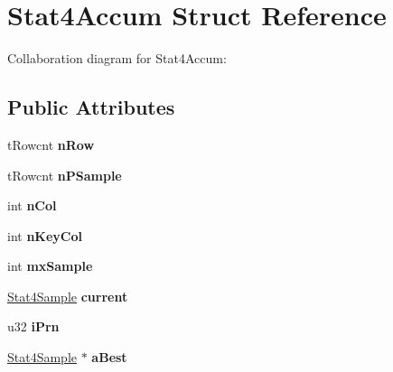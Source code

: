 \hypertarget{struct_stat4_accum}{\section{Stat4\+Accum Struct Reference}
\label{struct_stat4_accum}
}


Collaboration diagram for Stat4\+Accum\+:
\subsection*{Public Attributes}
\begin{DoxyCompactItemize}
\item 
\hypertarget{struct_stat4_accum_a7f06c1f2e4790e21b25aa68e5340f0b3}{t\+Rowcnt {\bfseries n\+Row}}\label{struct_stat4_accum_a7f06c1f2e4790e21b25aa68e5340f0b3}

\item 
\hypertarget{struct_stat4_accum_ac86c036108462008795ebfb7994ff674}{t\+Rowcnt {\bfseries n\+P\+Sample}}\label{struct_stat4_accum_ac86c036108462008795ebfb7994ff674}

\item 
\hypertarget{struct_stat4_accum_a4b5d9944be8bd28e2dcaaa10d23702db}{int {\bfseries n\+Col}}\label{struct_stat4_accum_a4b5d9944be8bd28e2dcaaa10d23702db}

\item 
\hypertarget{struct_stat4_accum_a018b3aa526f4d376e55042e290c935c4}{int {\bfseries n\+Key\+Col}}\label{struct_stat4_accum_a018b3aa526f4d376e55042e290c935c4}

\item 
\hypertarget{struct_stat4_accum_a2133206dd5209b1b0fce485bc6d48043}{int {\bfseries mx\+Sample}}\label{struct_stat4_accum_a2133206dd5209b1b0fce485bc6d48043}

\item 
\hypertarget{struct_stat4_accum_a9e65f562b6944448edde933a6d29fdf2}{\hyperlink{struct_stat4_sample}{Stat4\+Sample} {\bfseries current}}\label{struct_stat4_accum_a9e65f562b6944448edde933a6d29fdf2}

\item 
\hypertarget{struct_stat4_accum_a13746aceec404f569af80ee44c9315ac}{u32 {\bfseries i\+Prn}}\label{struct_stat4_accum_a13746aceec404f569af80ee44c9315ac}

\item 
\hypertarget{struct_stat4_accum_a634729ee0061b7243e770b6281d9a7a4}{\hyperlink{struct_stat4_sample}{Stat4\+Sample} $\ast$ {\bfseries a\+Best}}\label{struct_stat4_accum_a634729ee0061b7243e770b6281d9a7a4}


\end{DoxyCompactItemize}
